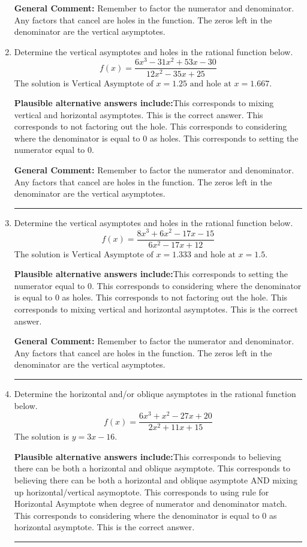 \documentclass{extbook}[14pt]
\newcommand{\litem}[1]{\item #1

\rule{\textwidth}{0.4pt}}
\begin{document}
\begin{enumerate}
{\textbf{General Comment:} Remember to factor the numerator and denominator. Any factors that cancel are holes in the function. The zeros left in the denominator are the vertical asymptotes.
}
\litem{
Determine the vertical asymptotes and holes in the rational function below.
\[ f(x) = \frac{6x^{3} -31 x^{2} +53 x -30}{12x^{2} -35 x + 25} \]The solution is \( \text{Vertical Asymptote of } x = 1.25 \text{ and hole at } x = 1.667 \).\begin{enumerate}[label=\Alph*.]
\textbf{Plausible alternative answers include:}This corresponds to mixing vertical and horizontal asymptotes.
This is the correct answer.
This corresponds to not factoring out the hole.
This corresponds to considering where the denominator is equal to 0 as holes.
This corresponds to setting the numerator equal to 0.
\end{enumerate}

\textbf{General Comment:} Remember to factor the numerator and denominator. Any factors that cancel are holes in the function. The zeros left in the denominator are the vertical asymptotes.
}
\litem{
Determine the vertical asymptotes and holes in the rational function below.
\[ f(x) = \frac{8x^{3} +6 x^{2} -17 x -15}{6x^{2} -17 x + 12} \]The solution is \( \text{Vertical Asymptote of } x = 1.333 \text{ and hole at } x = 1.5 \).\begin{enumerate}[label=\Alph*.]
\textbf{Plausible alternative answers include:}This corresponds to setting the numerator equal to 0.
This corresponds to considering where the denominator is equal to 0 as holes.
This corresponds to not factoring out the hole.
This corresponds to mixing vertical and horizontal asymptotes.
This is the correct answer.
\end{enumerate}

\textbf{General Comment:} Remember to factor the numerator and denominator. Any factors that cancel are holes in the function. The zeros left in the denominator are the vertical asymptotes.
}
\litem{
Determine the horizontal and/or oblique asymptotes in the rational function below.
\[ f(x) = \frac{6x^{3} + x^{2} -27 x + 20}{2x^{2} +11 x + 15} \]The solution is \( y = 3x -16 \).\begin{enumerate}[label=\Alph*.]
\textbf{Plausible alternative answers include:}This corresponds to believing there can be both a horizontal and oblique asymptote.
This corresponds to believing there can be both a horizontal and oblique asymptote AND mixing up horizontal/vertical asymoptote.
This corresponds to using rule for Horizontal Asymptote when degree of numerator and denominator match.
This corresponds to considering where the denominator is equal to 0 as horizontal asymptote.
This is the correct answer.
\end{enumerate}

}
\end{enumerate}
\end{document}

